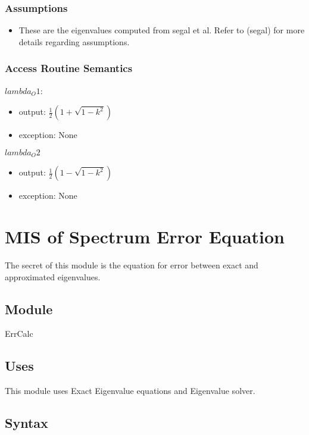 \documentclass[12pt, titlepage]{article}
\begin{document}
\subsubsection{Assumptions}

\begin{itemize}
	\item These are the eigenvalues computed from segal et al. Refer to (segal) 
	for more details regarding assumptions.
\end{itemize}

\subsubsection{Access Routine Semantics}


$lambda_O1$:
\begin{itemize}
	\item output: $\frac{1}{2} (1+\sqrt{1-k^{2}})$ 
	\item exception: None
\end{itemize}


\noindent $lambda_O2$
\begin{itemize} 
	\item output: $\frac{1}{2} (1-\sqrt{1-k^{2}})$ 
	\item exception: None
\end{itemize}


\newpage

\section{MIS of Spectrum Error Equation} 

The secret of this module is the equation for error between exact and 
approximated eigenvalues.

\subsection{Module}

ErrCalc

\subsection{Uses}

This module uses Exact Eigenvalue equations and Eigenvalue solver. 

\subsection{Syntax}
\end{document}
